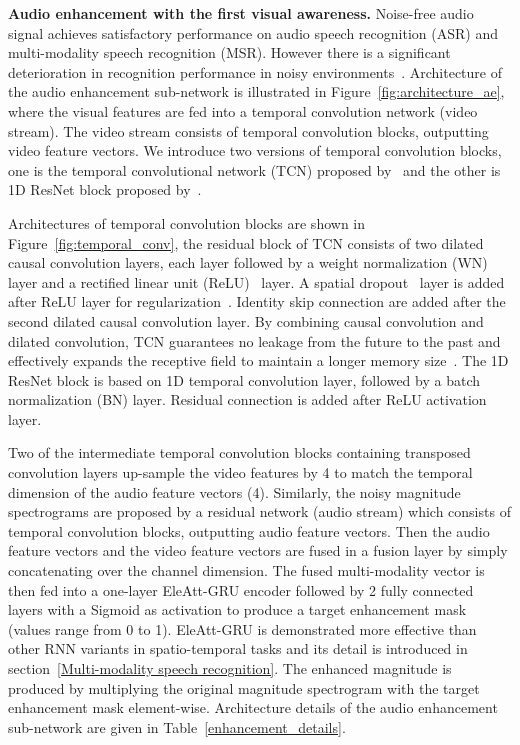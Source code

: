 \documentclass[10pt,twocolumn,letterpaper]{article}
\begin{document}
{\bf Audio enhancement with the first visual awareness.} Noise-free audio signal achieves satisfactory performance on audio speech recognition (ASR) and multi-modality speech recognition (MSR). However there is a significant deterioration in recognition performance in noisy environments~\cite{Triantafyllos-avsr2018,afouras2018conversation}. Architecture of the audio enhancement sub-network is illustrated in Figure~\ref{fig:architecture_ae}, where the visual features are fed into a temporal convolution network (video stream). The video stream consists of  temporal convolution blocks, outputting video feature vectors. We introduce two versions of temporal convolution blocks, one is the temporal convolutional network (TCN) proposed by~\cite{bai2018empirical} and the other is 1D ResNet block proposed by~\cite{afouras2019my}.

Architectures of temporal convolution blocks are shown in Figure~\ref{fig:temporal_conv}, the residual block of TCN consists of two dilated causal convolution layers, each layer followed by a weight normalization (WN)~\cite{salimans2016weight} layer and a rectified linear unit (ReLU)~\cite{nair2010rectified} layer. A spatial dropout~\cite{srivastava2014dropout} layer is added after ReLU layer for regularization~\cite{bai2018empirical}. Identity skip connection are added after the second dilated causal convolution layer. By combining causal convolution and dilated convolution, TCN guarantees no leakage from the future to the past and effectively expands the receptive field to maintain a longer memory size~\cite{bai2018empirical}. The 1D ResNet block is based on 1D temporal convolution layer, followed by a batch normalization (BN) layer. Residual connection is added after ReLU activation layer. 

Two of the intermediate temporal convolution blocks containing transposed convolution layers up-sample the video features by 4 to match the temporal dimension of the audio feature vectors (4). Similarly, the noisy magnitude spectrograms are proposed by a residual network (audio stream) which consists of  temporal convolution blocks, outputting audio feature vectors. Then the audio feature vectors and the video feature vectors are fused in a fusion layer by simply concatenating over the channel dimension. The fused multi-modality vector is then fed into a one-layer EleAtt-GRU encoder followed by 2 fully connected layers with a Sigmoid as activation to produce a target enhancement mask (values range from 0 to 1). EleAtt-GRU is demonstrated more effective than other RNN variants in spatio-temporal tasks and its detail is introduced in section~\ref{Multi-modality speech recognition}. The enhanced magnitude is produced by multiplying the original magnitude spectrogram with the target enhancement mask element-wise. Architecture details of the audio enhancement sub-network are given in Table~\ref{enhancement_details}.
\end{document}
